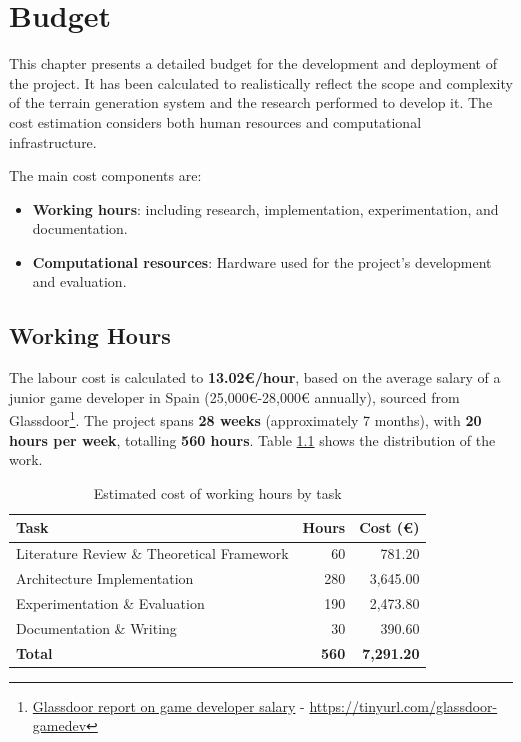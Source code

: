 
\chapter{Budget} \label{chap:Budget} 
This chapter presents a detailed budget for the development and deployment of the project. It has been calculated to realistically reflect the scope and complexity of the terrain generation system and the research performed to develop it. 
The cost estimation considers both human resources and computational infrastructure.

The main cost components are:

\begin{itemize}
  \item \textbf{Working hours}: including research, implementation, experimentation, and documentation.
  \item \textbf{Computational resources}: Hardware used for the project's development and evaluation. %
\end{itemize}

\section{Working Hours}
The labour cost is calculated to \textbf{13.02€/hour}, based on the average salary of a junior game developer in Spain (25,000€-28,000€ annually), sourced from Glassdoor\footnote{\href{https://www.glassdoor.es/Salaries/junior-game-developer-salary-SRCH_KO0,21.htm}{Glassdoor report on game developer salary} - \url{https://tinyurl.com/glassdoor-gamedev}}.
The project spans \textbf{28 weeks} (approximately 7 months), with \textbf{20 hours per week}, totalling \textbf{560 hours}. Table \ref{tab:work_distribution} shows the distribution of the work.

\begin{table}[H]
\centering
\begin{tabular}{|l|r|r|}
\hline
\textbf{Task} & \textbf{Hours} & \textbf{Cost (€)} \\
\hline
Literature Review \& Theoretical Framework & 60 & 781.20\\
Architecture Implementation & 280 & 3,645.00\\
Experimentation \& Evaluation & 190 & 2,473.80\\
Documentation \& Writing & 30 & 390.60 \\
\hline
\textbf{Total} & \textbf{560} & \textbf{7,291.20} \\
\hline
\end{tabular}
\caption{Estimated cost of working hours by task}
\label{tab:work_distribution}
\end{table}

